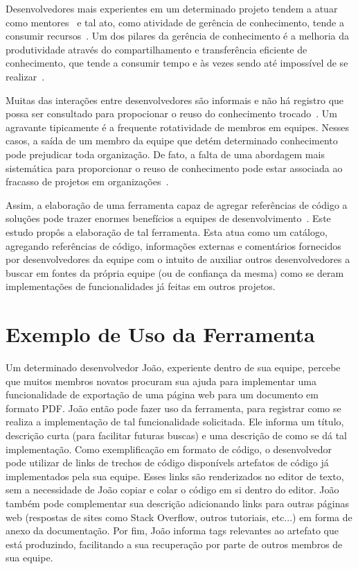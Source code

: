 Desenvolvedores mais experientes em um determinado projeto tendem a atuar como mentores~\cite{CubraniC2004} e tal ato, como atividade de gerência de conhecimento, tende a consumir recursos~\cite{Wiig2003}. Um dos pilares da gerência de conhecimento é a melhoria da produtividade através do compartilhamento e transferência eficiente de conhecimento, que tende a consumir tempo e às vezes sendo até impossível de se realizar~\cite{Levy2009}.

Muitas das interações entre desenvolvedores são informais e não há registro que possa ser consultado para propocionar o reuso do conhecimento trocado~\cite{Olson2000}. Um agravante tipicamente é a frequente rotatividade de membros em equipes. Nesses casos, a saída de um membro da equipe que detém determinado conhecimento pode prejudicar toda organização. De fato, a falta de uma abordagem mais sistemática para proporcionar o reuso de conhecimento pode estar associada ao fracasso de projetos em organizações~\cite{Hall2008}.

Assim, a elaboração de uma ferramenta capaz de agregar referências de código a soluções pode trazer enormes benefícios a equipes de desenvolvimento~\cite{CubraniC2004}. Este estudo propôs a elaboração de tal ferramenta. Esta atua como um catálogo, agregando referências de código, informações externas e comentários fornecidos por desenvolvedores da equipe com o intuito de auxiliar outros desenvolvedores a buscar em fontes da própria equipe (ou de confiança da mesma) como se deram implementações de funcionalidades já feitas em outros projetos.

\section{Exemplo de Uso da Ferramenta}

Um determinado desenvolvedor João, experiente dentro de sua equipe, percebe que muitos membros novatos procuram sua ajuda para implementar uma funcionalidade de exportação de uma página web para um documento em formato PDF. João então pode fazer uso da ferramenta, para registrar como se realiza a implementação de tal funcionalidade solicitada. Ele informa um título, descrição curta (para facilitar futuras buscas) e uma descrição de como se dá tal implementação. Como exemplificação em formato de código, o desenvolvedor pode utilizar de links de trechos de código disponívels artefatos de código já implementados pela sua equipe. Esses links são renderizados no editor de texto, sem a necessidade de João copiar e colar o código em si dentro do editor. João também pode complementar sua descrição adicionando links para outras páginas web (respostas de sites como Stack Overflow, outros tutoriais, etc...) em forma de anexo da documentação. Por fim, João informa tags relevantes ao artefato que está produzindo, facilitando a sua recuperação por parte de outros membros de sua equipe.


